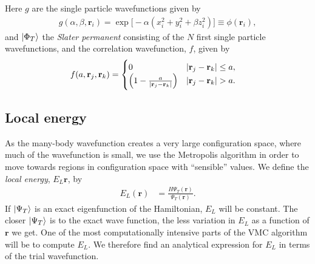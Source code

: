 \documentclass[
    a4paper, aps, twocolumn, floatfix, superscriptaddress]{revtex4-1}
\newcommand{\vf}{\mathbf}
\newcommand{\1}{\mathds{1}}
\begin{document}
    Here $g$ are the single particle wavefunctions given by
    \begin{align}
        g(\alpha, \beta, \vf{r}_i)
        = \exp\bigl[
            -\alpha(x_i^2 + y_i^2 + \beta z_i^2)
        \bigr] \equiv \phi(\vf{r}_i),
    \end{align}
    and $\ket{\Phi_T}$ the \textit{Slater permanent} consisting of the $N$ first
    single particle wavefunctions, and the correlation wavefunction, $f$, given
    by
    \begin{align}
        f(a, \vf{r}_j, \vf{r}_k)
        &=
        \begin{cases}
            0 & |\vf{r}_j - \vf{r}_k| \leq a, \\
            \Bigl(
                1 - \frac{a}{|\vf{r}_j - \vf{r}_k|}
            \Bigr) & |\vf{r}_j - \vf{r}_k| > a.
        \end{cases}
    \end{align}

    \subsection{Local energy}
        As the many-body wavefunction creates a very large configuration space,
        where much of the wavefunction is small, we use the Metropolis algorithm
        in order to move towards regions in configuration space with
        ``sensible'' values. We define the \textit{local energy}, $E_L{\vf{r}}$,
        by
        \begin{align}
            E_L(\vf{r})
            &= \frac{H\Psi_T(\vf{r})}{\Psi_T(\vf{r})}.
        \end{align}
        If $\ket{\Psi_T}$ is an exact eigenfunction of the Hamiltonian, $E_L$
        will be constant. The closer $\ket{\Psi_T}$ is to the exact wave
        function, the less variation in $E_L$ as a function of $\vf{r}$ we get.
        One of the most computationally intensive parts of the VMC algorithm
        will be to compute $E_L$. We therefore find an analytical expression for
        $E_L$ in terms of the trial wavefunction.
\end{document}
